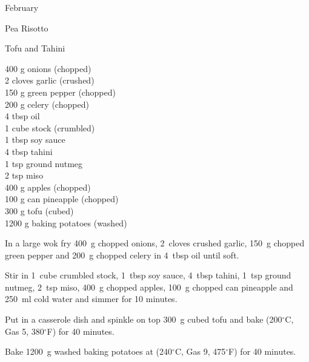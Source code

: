 \begin{menu}{February}
\begin{recipe}{2}{Pea Risotto}
\begin{instructions}
    \end{instructions}
    \end{recipe}%
  
    \begin{recipe}{2}{Tofu and Tahini}%
		\begin{ingredients}
		400 g onions (chopped) \\
	2 cloves garlic (crushed) \\
	150 g green pepper (chopped) \\
	200 g celery (chopped) \\
	4 tbsp oil  \\
	1 cube stock (crumbled) \\
	1 tbsp soy sauce  \\
	4 tbsp tahini  \\
	1 tsp ground nutmeg  \\
	2 tsp miso  \\
	400 g apples (chopped) \\
	100 g can pineapple (chopped) \\
	300 g tofu (cubed) \\
	1200 g baking potatoes (washed) \\
	
		\end{ingredients}
	
    \begin{instructions}
    \item 
        In a large wok fry
        400~g chopped onions,
        2~cloves crushed garlic,
        150~g chopped green pepper
        and
        200~g chopped celery
        in
        4~tbsp  oil
        until soft.
      \item 
        Stir in
        1~cube crumbled stock,
        1~tbsp  soy sauce,
        4~tbsp  tahini,
        1~tsp  ground nutmeg,
        2~tsp  miso,
        400~g chopped apples,
        100~g chopped can pineapple
        and
        250~ml  cold water
        and simmer for 10 minutes.
      \item 
        Put in a casserole dish
        and spinkle on top
        300~g cubed tofu
        and bake (200$^{\circ}$C, Gas 5, 380$^{\circ}$F) for 40 minutes.
      \item 
      Bake 
      1200~g washed baking potatoes
      at
      (240$^{\circ}$C, Gas 9, 475$^{\circ}$F) for 40 minutes.
    
    \end{instructions}
    \end{recipe}%
  

\end{menu}
